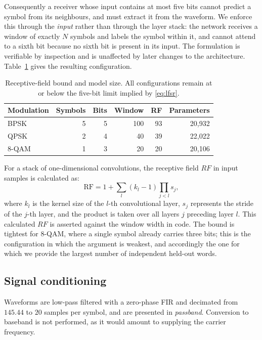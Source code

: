 \documentclass[journal]{IEEEtran}   %
\begin{document}
Consequently a receiver whose input contains at most five bits cannot predict a
symbol from its neighbours, and must extract it from the waveform. We enforce
this through the \emph{input} rather than through the layer stack: the network
receives a window of exactly $N$ symbols and labels the symbol within it, and
cannot attend to a sixth bit because no sixth bit is present in its input. The
formulation is verifiable by inspection and is unaffected by later changes to
the architecture. Table~\ref{tab:bound} gives the resulting configuration.

\begin{table}[!t]
\caption{Receptive-field bound and model size. All configurations remain at or
below the five-bit limit implied by \eqref{eq:lfsr}.}
\label{tab:bound}
\centering
\begin{tabular}{lrrrrr}
\toprule
Modulation & Symbols & Bits & Window & RF & Parameters \\
\midrule
BPSK  & 5 & 5 & 100 & 93 & 20{,}932 \\
QPSK  & 2 & 4 &  40 & 39 & 22{,}022 \\
8-QAM & 1 & 3 &  20 & 20 & 20{,}106 \\
\bottomrule
\end{tabular}
\end{table}

For a stack of one-dimensional convolutions, the receptive field $RF$ in input samples is calculated as:
\begin{equation}
\mathrm{RF} = 1 + \sum_{l} (k_l - 1)\prod_{j<l} s_j ,
\label{eq:rf}
\end{equation}
where $k_l$ is the kernel size of the $l$-th convolutional layer, $s_j$ represents the stride of the $j$-th layer, and the product is taken over all layers $j$ preceding layer $l$. This calculated $RF$ is asserted against the window width in code. The bound is tightest for 8-QAM, where a single symbol already carries three bits; this is the configuration in which the argument is weakest, and accordingly the one for which we provide the largest number of independent held-out words.

\subsection{Signal conditioning}
Waveforms are low-pass filtered with a zero-phase FIR and decimated from
$145.44$ to $20$ samples per symbol, and are presented in \emph{passband}.
Conversion to baseband is not performed, as it would amount to supplying the
carrier frequency.
\end{document}
